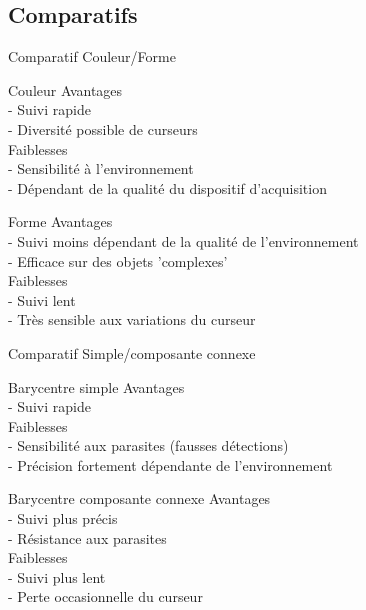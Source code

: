 \documentclass{beamer}
\begin{document}
		\subsection{Comparatifs}
		\begin{frame}{Comparatif Couleur/Forme}
		\pause
			\begin{block}{Couleur}
				Avantages \\
				- Suivi rapide \\
				- Diversité possible de curseurs \\
				Faiblesses \\
				- Sensibilité à l'environnement\\
				- Dépendant de la qualité du dispositif d'acquisition\\
			\end{block}
			\pause
			\begin{block}{Forme}
				Avantages \\
				- Suivi moins dépendant de la qualité de l'environnement \\
				- Efficace sur des objets 'complexes'\\
				Faiblesses \\
				- Suivi  lent \\
				- Très sensible aux variations du curseur\\
			\end{block}
		\end{frame}
		\begin{frame}{Comparatif Simple/composante connexe}
		\pause
			\begin{block}{Barycentre simple}
				Avantages \\
				- Suivi rapide \\
				Faiblesses \\
				- Sensibilité aux parasites (fausses détections)\\
				- Précision fortement dépendante de l'environnement\\
			\end{block}
			\pause
			\begin{block}{Barycentre composante connexe}
				Avantages \\
				- Suivi plus précis \\
				- Résistance aux parasites \\
				Faiblesses \\
				- Suivi plus lent \\
				- Perte occasionnelle du curseur
			\end{block}
		\end{frame}
\end{document}
